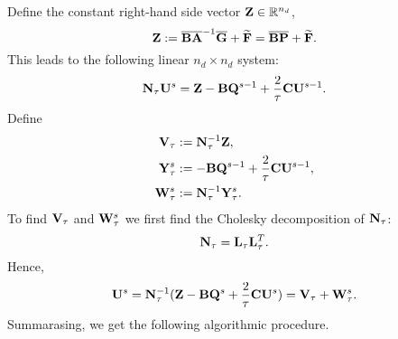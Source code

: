 \begin{discussion}
  Define the constant right-hand side vector ${\bf Z} \in \mathbb{R}^{n_d}$,
  \begin{equation}
    {\bf Z}
    := \overline{\bf B} \overline{\bf A}^{-1} \overline{\bf G}
      + \widetilde{\bf F}
    = \overline{\bf B} \overline{\bf P} + \widetilde{\bf F}.
  \end{equation}
  This leads to the following linear $n_d \times n_d$ system:
  \begin{equation}
    {\bf N}_\tau {\bf U}^s
    = {\bf Z}
    - {\bf B} {\bf Q}^{s - 1}
    + \frac{2}{\tau} {\bf C} {\bf U}^{s - 1}.
  \end{equation}
  Define 
  \begin{align}
    {\bf V}_\tau & := {\bf N}_\tau^{-1} {\bf Z}, \\
    {\bf Y}_\tau^s
    & := - {\bf B} {\bf Q}^{s - 1} + \frac{2}{\tau} {\bf C} {\bf U}^{s - 1}, \\
    {\bf W}_\tau^s & := {\bf N}_\tau^{-1} {\bf Y}_\tau^s.
  \end{align}
  To find ${\bf V}_\tau$ and ${\bf W}_\tau^s$ we first find the Cholesky
  decomposition of ${\bf N}_\tau$:
  \begin{equation}
    {\bf N}_\tau = {\bf L}_\tau {\bf L}_\tau^T.
  \end{equation}
  Hence,
  \begin{equation}
    {\bf U}^s
    = {\bf N}_\tau^{-1}
      ({\bf Z} - {\bf B} {\bf Q}^s + \frac{2}{\tau} {\bf C} {\bf U}^s)
    = {\bf V}_\tau + {\bf W}_\tau^s.
  \end{equation}
  Summarasing, we get the following algorithmic procedure.
\end{discussion}
